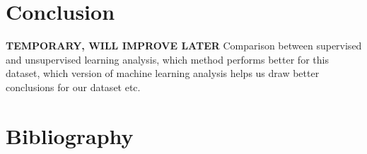 \documentclass[12pt]{article}
\begin{document}
\section{Conclusion}

\textbf{TEMPORARY, WILL IMPROVE LATER} Comparison between supervised and unsupervised learning analysis, which method performs better for this dataset, which version of machine learning analysis helps us draw better conclusions for our dataset etc. 

 \section{Bibliography}
  
 
\end{document}
